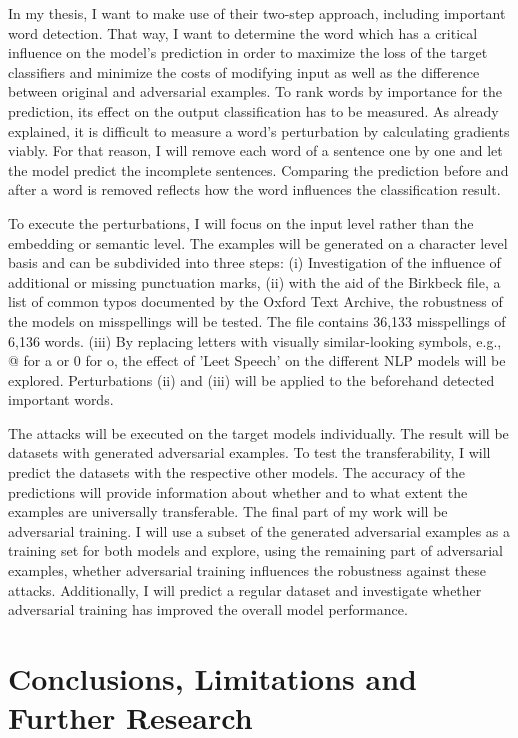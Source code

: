 In my thesis, I want to make use of their two-step approach, including important word detection. That way, I want to determine the word which has a critical influence on the model's prediction in order to maximize the loss of the target classifiers and minimize the costs of modifying input as well as the difference between original and adversarial examples. 
To rank words by importance for the prediction, its effect on the output classification has to be measured. As already explained, it is difficult to measure a word's perturbation by calculating gradients viably. 
For that reason, I will remove each word of a sentence one by one and let the model predict the incomplete sentences. 
 Comparing the prediction before and after a word is removed reflects how the word influences the classification result.

To execute the perturbations, I will focus on the input level rather than the embedding or semantic level. The examples will be generated on a character level basis and can be subdivided into three steps:
(i) Investigation of the influence of additional or missing punctuation marks,
(ii) with the aid of the Birkbeck file, a list of common typos documented by the Oxford Text Archive, the robustness of the models on misspellings will be tested. The file contains 36,133 misspellings of 6,136 words.
(iii) By replacing letters with visually similar-looking symbols, e.g., @ for a or 0 for o, the effect of 'Leet Speech' on the different NLP models will be explored.
Perturbations (ii) and (iii) will be applied to the beforehand detected important words.

The attacks will be executed on the target models individually.
The result will be datasets with generated adversarial examples. To test the transferability, I will predict the datasets with the respective other models. The accuracy of the predictions will provide information about whether and to what extent the examples are universally transferable.
The final part of my work will be adversarial training. I will use a subset of the generated adversarial examples as a training set for both models and explore, using the remaining part of adversarial examples, whether adversarial training influences the robustness against these attacks. Additionally, I will predict a regular dataset and investigate whether adversarial training has improved the overall model performance.

\section{Conclusions, Limitations and Further Research}

